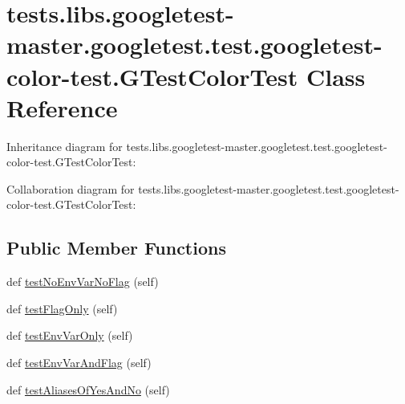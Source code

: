 \hypertarget{classtests_1_1libs_1_1googletest-master_1_1googletest_1_1test_1_1googletest-color-test_1_1GTestColorTest}{}\section{tests.\+libs.\+googletest-\/master.googletest.\+test.\+googletest-\/color-\/test.G\+Test\+Color\+Test Class Reference}
\label{classtests_1_1libs_1_1googletest-master_1_1googletest_1_1test_1_1googletest-color-test_1_1GTestColorTest}


Inheritance diagram for tests.\+libs.\+googletest-\/master.googletest.\+test.\+googletest-\/color-\/test.G\+Test\+Color\+Test\+:


Collaboration diagram for tests.\+libs.\+googletest-\/master.googletest.\+test.\+googletest-\/color-\/test.G\+Test\+Color\+Test\+:
\subsection*{Public Member Functions}
\begin{DoxyCompactItemize}
\item 
def \hyperlink{classtests_1_1libs_1_1googletest-master_1_1googletest_1_1test_1_1googletest-color-test_1_1GTestColorTest_a61cf5133d1c90c8e3c3fb766933250fa}{test\+No\+Env\+Var\+No\+Flag} (self)
\item 
def \hyperlink{classtests_1_1libs_1_1googletest-master_1_1googletest_1_1test_1_1googletest-color-test_1_1GTestColorTest_a1ed13ffc64bdd51a736f31e1e702349e}{test\+Flag\+Only} (self)
\item 
def \hyperlink{classtests_1_1libs_1_1googletest-master_1_1googletest_1_1test_1_1googletest-color-test_1_1GTestColorTest_a619c5a4b04b434a6529b8e2eefc2a7ae}{test\+Env\+Var\+Only} (self)
\item 
def \hyperlink{classtests_1_1libs_1_1googletest-master_1_1googletest_1_1test_1_1googletest-color-test_1_1GTestColorTest_aa819d27750950d99023ab50a9a805218}{test\+Env\+Var\+And\+Flag} (self)
\item 
def \hyperlink{classtests_1_1libs_1_1googletest-master_1_1googletest_1_1test_1_1googletest-color-test_1_1GTestColorTest_ae5c4764abf36d3dc29aeafd93645a5b2}{test\+Aliases\+Of\+Yes\+And\+No} (self)
\end{DoxyCompactItemize}


